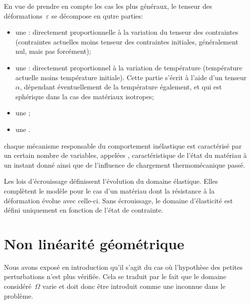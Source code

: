 \bigskip
En vue de prendre en compte les cas les plus généraux, le tenseur des déformations~$\varepsilon$
se décompose en qutre parties:
\begin{itemize}
	\item une : directement proportionnelle à la variation du tenseur
		des contraintes (contraintes actuelles moins tenseur des contraintes initiales, généralement
		nul, mais pas forcément);
	\item une : directement proportionnel à la variation de
		température (température actuelle moins température initiale). Cette partie
		s'écrit à l'aide d'un tenseur~$\alpha$, dépendant éventuellement de la
		température également, et qui est sphérique dans la cas des matériaux isotropes;
	\item une ;
	\item une .
\end{itemize}

\medskip
chaque mécanisme responsable du comportement inélastique est caractérisé par un certain
nombre de variables, appelées , caractéristique de l'état
du matériau à un instant donné ainsi que de l'influence de chargement thermomécanique passé.

Les lois d'écrouissage définissent l'évolution du domaine élastique.
Elles complètent le modèle pour le cas d'un matériau dont la résistance à la
déformation évolue avec celle-ci.
Sans écrouissage, le domaine d'élasticité est défini uniquement en fonction de
l'état de contrainte.










\medskip
\section{Non linéarité géométrique}\label{Sec-NLg}
Nous avons exposé en introduction qu'il s'agit du cas où l'hypothèse des petites perturbations
n'est plus vérifiée.
Cela se traduit par le fait que le domaine considéré~$\Omega$ varie et doit donc être introduit comme
une inconnue dans le problème.

